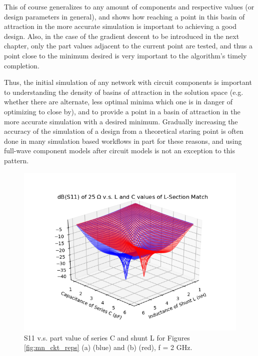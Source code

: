 \documentclass[12pt]{usfcoe}
\begin{document}
    This of course generalizes to any amount of components and respective values (or design parameters in general), and shows how reaching a point in this basin of attraction in the more accurate simulation is important to achieving a good design.
    Also, in the case of the gradient descent to be introduced in the next chapter, only the part values adjacent to the current point are tested, and thus a point close to the minimum desired is very important to the algorithm's timely completion. 
    
    Thus, the initial simulation of any network with circuit components is important to understanding the density of basins of attraction in the solution space (e.g. whether there are alternate, less optimal minima which one is in danger of optimizing to close by), and to provide a point in a basin of attraction in the more accurate simulation with a desired minimum. 
    Gradually increasing the accuracy of the simulation of a design from a theoretical staring point is often done in many simulation based workflows in part for these reasons, and using full-wave component models after circuit models is not an exception to this pattern.
    
    \begin{figure}[H]
		\begin{center}
        	\includegraphics[width=\textwidth]{images/cosimulation_inform/match_surface_isometric.png} 
            \caption{S11 v.s. part value of series C and shunt L for Figures \ref{fig:mn_ckt_reps} (a) (blue) and (b) (red), f = 2 GHz.}
            \label{fig:2d_cost_visual}
		\end{center}
	\end{figure}
	
\end{document}
